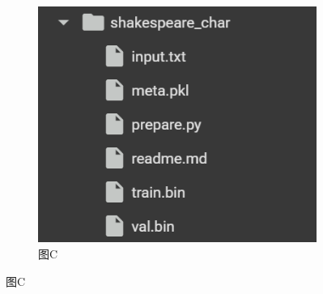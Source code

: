 \documentclass[../main]{subfiles}
\begin{document}
\begin{figure}[H]
\begin{subfigure}{0.3\textwidth}
        \includegraphics[width=\linewidth]{figure/template/2025-05-19 232610.png}
        \caption{图C}
        \label{fig:grid-c}
    \end{subfigure}
    
    \vspace{0.5cm} %
    

\end{figure}
\end{document}
